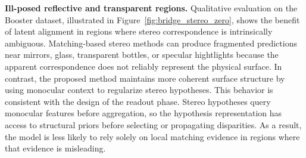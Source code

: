 \noindent\textbf{Ill-posed reflective and transparent regions.}
Qualitative evaluation on the Booster dataset, illustrated in Figure~\ref{fig:bridge_stereo_zero}, shows the benefit of latent alignment in regions where stereo correspondence is intrinsically ambiguous.
Matching-based stereo methods can produce fragmented predictions near mirrors, glass, transparent bottles, or specular hightlights because the apparent correspondence does not reliably represent the physical surface.
In contrast, the proposed method maintains more coherent surface structure by using monocular context to regularize stereo hypotheses.
This behavior is consistent with the design of the readout phase.
Stereo hypotheses query monocular features before aggregation, so the hypothesis representation has access to structural priors before selecting or propagating disparities.
As a result, the model is less likely to rely solely on local matching evidence in regions where that evidence is misleading.

